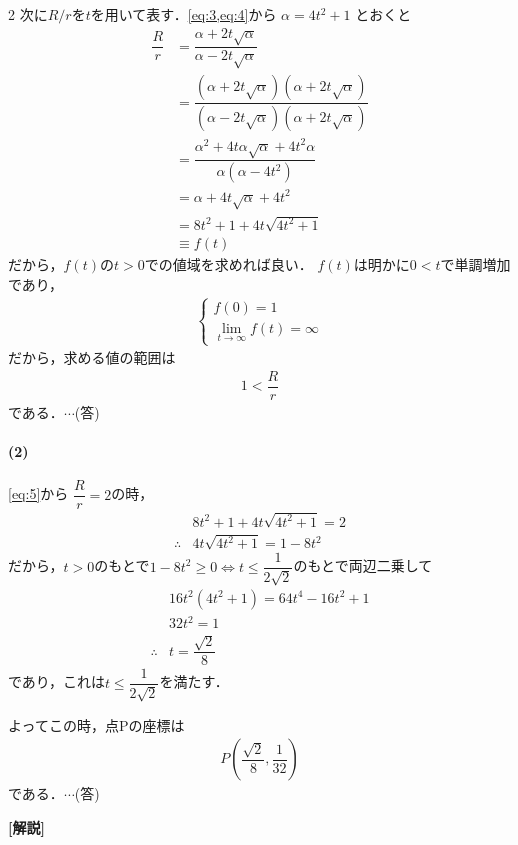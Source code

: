 \documentclass[../../main.tex]{subfiles}
\begin{document}
\begin{multicols}{2}
  次に$R/r$を$t$を用いて表す．\cref{eq:3,eq:4}から
  $\alpha = 4t^2+1$ とおくと
  \begin{align}
    \dfrac{R}{r}
    & = \dfrac{\alpha+2t\sqrt{\alpha}}{\alpha-2t\sqrt{\alpha}}                                                                                                 \\
    & = \dfrac{\left(\alpha+2t\sqrt{\alpha}\right)\left(\alpha+2t\sqrt{\alpha}\right)}{\left(\alpha-2t\sqrt{\alpha}\right)\left(\alpha+2t\sqrt{\alpha}\right)} \\
    & = \dfrac{\alpha^2+4t\alpha\sqrt{\alpha}+4t^2\alpha}{\alpha(\alpha-4t^2)} \\
    & = \alpha +4t\sqrt{\alpha} + 4t^2 \\
    & = 8t^2+1+4t\sqrt{4t^2+1}  \\
    & \equiv f(t) \label{eq:5}
  \end{align}
  だから，$f(t)$の$t>0$での値域を求めれば良い．
  $f(t)$は明かに$0<t$で単調増加であり，
  \begin{align}
    \begin{cases}
      f(0)                  = 1      \\
      \lim_{t\to\infty}f(t) = \infty
    \end{cases}
  \end{align}
  だから，求める値の範囲は
  \begin{align}
    1 < \dfrac{R}{r}
  \end{align}
  である．$\cdots$(答)

  \paragraph{(2)}
  \cref{eq:5}から $\dfrac{R}{r}=2$の時，
  \begin{align}
    & 8t^2+1+4t\sqrt{4t^2+1} = 2 \\
    \therefore
    & 4t\sqrt{4t^2+1} = 1-8t^2
  \end{align}
  だから，$t>0$のもとで$1-8t^2\ge0 \iff t \le \dfrac{1}{2\sqrt{2}}$のもとで両辺二乗して
  \begin{align}
    & 16t^2(4t^2+1) = 64t^4-16t^2+1 \\
    & 32t^2 = 1                     \\
    \therefore
    & t = \dfrac{\sqrt{2}}{8}
  \end{align}
  であり，これは$t \le \dfrac{1}{2\sqrt{2}}$を満たす．

  よってこの時，点Pの座標は
  \begin{align}
    P\left(\dfrac{\sqrt{2}}{8}, \dfrac{1}{32}\right)
  \end{align}
  である．$\cdots$(答)

  {\bf [解説]}

  \newpage
\end{multicols}
\end{document}
